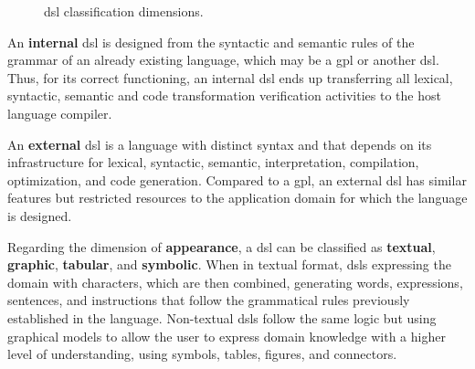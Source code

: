 \begin{figure}[!htb]
    \centering
    \caption{\ac{dsl} classification dimensions.}
    
    \label{fig:dsl}
\end{figure}

An \textbf{internal} \ac{dsl} is designed from the syntactic and semantic rules of the grammar of an already existing language, which may be a \ac{gpl} or another \ac{dsl}.
Thus, for its correct functioning, an internal \ac{dsl} ends up transferring all lexical, syntactic, semantic and code transformation verification activities to the host language compiler.

An \textbf{external} \ac{dsl} is a language with distinct syntax and that depends on its infrastructure for lexical, syntactic, semantic, interpretation, compilation, optimization, and code generation.
Compared to a \ac{gpl}, an external \ac{dsl} has similar features but restricted resources to the application domain for which the language is designed.

Regarding the dimension of \textbf{appearance}, a \ac{dsl} can be classified as \textbf{textual}, \textbf{graphic}, \textbf{tabular}, and \textbf{symbolic}.
When in textual format, \acp{dsl} expressing the domain with characters, which are then combined, generating words, expressions, sentences, and instructions that follow the grammatical rules previously established in the language.
Non-textual \acp{dsl} follow the same logic but using graphical models to allow the user to express domain knowledge with a higher level of understanding, using symbols, tables, figures, and connectors.

